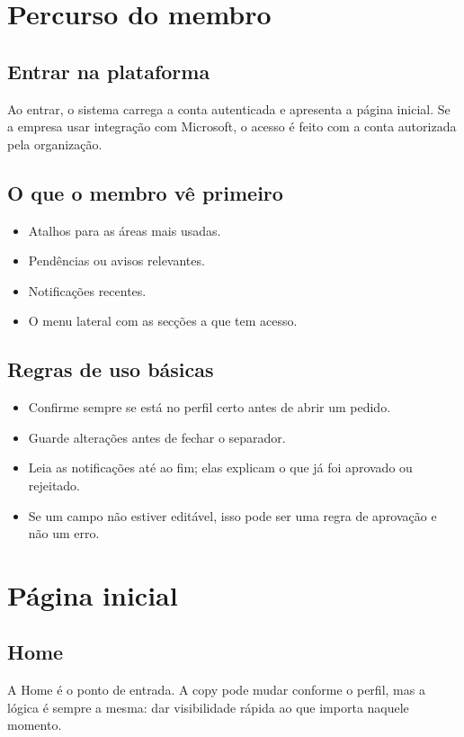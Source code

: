 \chapter{Percurso do membro}
\section{Entrar na plataforma}
Ao entrar, o sistema carrega a conta autenticada e apresenta a página inicial. Se a empresa usar integração com Microsoft, o acesso é feito com a conta autorizada pela organização.

\section{O que o membro vê primeiro}
\begin{itemize}
  \item Atalhos para as áreas mais usadas.
  \item Pendências ou avisos relevantes.
  \item Notificações recentes.
  \item O menu lateral com as secções a que tem acesso.
\end{itemize}

\section{Regras de uso básicas}
\begin{itemize}
  \item Confirme sempre se está no perfil certo antes de abrir um pedido.
  \item Guarde alterações antes de fechar o separador.
  \item Leia as notificações até ao fim; elas explicam o que já foi aprovado ou rejeitado.
  \item Se um campo não estiver editável, isso pode ser uma regra de aprovação e não um erro.
\end{itemize}

\chapter{Página inicial}
\section{Home}
A Home é o ponto de entrada. A copy pode mudar conforme o perfil, mas a lógica é sempre a mesma: dar visibilidade rápida ao que importa naquele momento.


